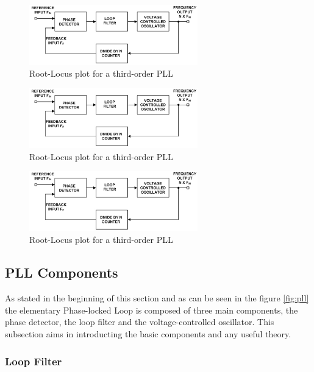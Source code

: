 \begin{figure}[htbp]
    \centering
    \includegraphics[width=0.65\textwidth]{./figures/pll.eps}
    \caption{ Root-Locus plot for a third-order PLL
    \label{fig:rlocus3}}
\end{figure}

\begin{figure}[htbp]
    \centering
    \includegraphics[width=0.65\textwidth]{./figures/pll.eps}
    \caption{ Root-Locus plot for a third-order PLL
    \label{fig:rlocus3}}
\end{figure}

\begin{figure}[htbp]
    \centering
    \includegraphics[width=0.65\textwidth]{./figures/pll.eps}
    \caption{ Root-Locus plot for a third-order PLL
    \label{fig:rlocus3}}
\end{figure}

\subsection{PLL Components}
As stated in the beginning of this section and as can be seen in the figure
\ref{fig:pll} the elementary Phase-locked Loop is composed of three main 
components, the phase detector, the loop filter and the voltage-controlled 
oscillator. This subsection aims in introducting the basic components and any
useful theory.

\subsubsection{Loop Filter}

